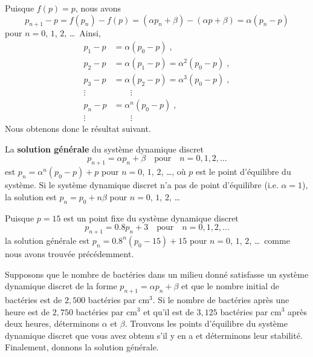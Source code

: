 {Puisque $f(p) = p$, nous avons
\[
p_{n+1} - p = f(p_n) - f(p) = (\alpha p_n + \beta) - (\alpha p + \beta)
= \alpha(p_n - p)
\]
pour $n=0$, $1$, $2$, \ldots\  Ainsi,
\begin{align*}
p_1-p &= \alpha (p_0-p) \; , \\
p_2-p &= \alpha (p_1-p) = \alpha^2 (p_0-p) \; , \\
p_3-p &= \alpha (p_2-p) = \alpha^3 (p_0-p) \; , \\
\vdots \qquad & \qquad \vdots \\
p_n-p &= \alpha^n (p_0-p) \;, \\
\vdots \qquad & \qquad \vdots
\end{align*}
Nous obtenons donc le résultat suivant.

\begin{prop}
La {\bfseries solution générale} du système dynamique discret  
\[
p_{n+1}= \alpha p_n + \beta  \quad \text{pour} \quad n=0, 1, 2, \ldots
\]
est $p_n = \alpha^n (p_0-p) + p$ pour $n=0$, $1$, $2$, \ldots, où $p$ est le
point d'équilibre du système.  Si le système dynamique discret n'a pas de
point d'équilibre (i.e. $\alpha =1$), la solution est $p_n = p_0 + n \beta$
pour $n=0$, $1$, $2$, \ldots
\end{prop}

\begin{egg}
Puisque $p=15$ est un point fixe du système dynamique discret
\[
p_{n+1} = 0.8p_n + 3 \quad \text{pour} \quad n=0, 1, 2, \ldots
\]
la solution générale est $p_n = 0.8^n (p_0-15) + 15$ pour $n=0$, $1$,
$2$, \ldots\ comme nous avons trouvée précédemment.
\end{egg}

\begin{egg}
Supposons que le nombre de bactéries dans un milieu donné satisfasse un
système dynamique discret de la forme
$\displaystyle p_{n+1} = \alpha p_n + \beta$ et que
le nombre initial de bactéries est de $2,500$ bactéries par cm$^3$.
Si le nombre de bactéries après une heure est de $2,750$ bactéries par
cm$^3$ et qu'il est de $3,125$ bactéries par cm$^3$ après deux heures,
déterminons $\alpha$ et $\beta$.  Trouvons les points d'équilibre du
système dynamique discret que vous avez obtenu s'il y en a et
déterminons leur stabilité. Finalement, donnons la solution
générale.


\end{egg}}
